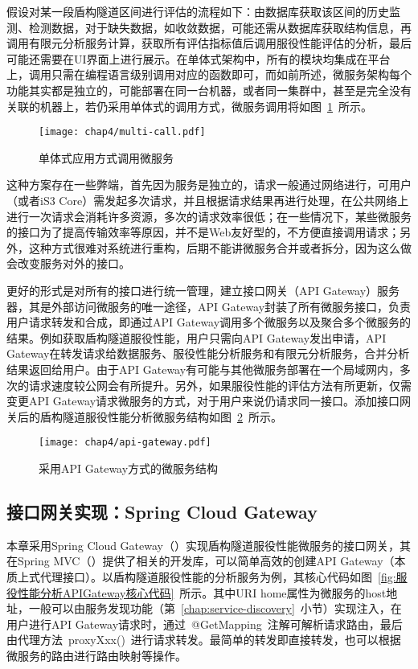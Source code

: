 假设对某一段盾构隧道区间进行评估的流程如下：由数据库获取该区间的历史监测、检测数据，对于缺失数据，如收敛数据，可能还需从数据库获取结构信息，再调用有限元分析服务计算，获取所有评估指标值后调用服役性能评估的分析，最后可能还需要在UI界面上进行展示。在单体式架构中，所有的模块均集成在平台上，调用只需在编程语言级别调用对应的函数即可，而如前所述，微服务架构每个功能其实都是独立的，可能部署在同一台机器，或者同一集群中，甚至是完全没有关联的机器上，若仍采用单体式的调用方式，微服务调用将如图~\ref{fig:单体架构方式调用微服务}~所示。

\begin{figure}[htb!]
    \centering
    \texttt{[image: chap4/multi-call.pdf]}
    \caption{单体式应用方式调用微服务}
    \label{fig:单体架构方式调用微服务}
\end{figure}

这种方案存在一些弊端，首先因为服务是独立的，请求一般通过网络进行，可用户（或者iS3 Core）需发起多次请求，并且根据请求结果再进行处理，在公共网络上进行一次请求会消耗许多资源，多次的请求效率很低；在一些情况下，某些微服务的接口为了提高传输效率等原因，并不是Web友好型的，不方便直接调用请求；另外，这种方式很难对系统进行重构，后期不能讲微服务合并或者拆分，因为这么做会改变服务对外的接口。

更好的形式是对所有的接口进行统一管理，建立接口网关（API Gateway）服务器，其是外部访问微服务的唯一途径，API Gateway封装了所有微服务接口，负责用户请求转发和合成，即通过API Gateway调用多个微服务以及聚合多个微服务的结果。例如获取盾构隧道服役性能，用户只需向API Gateway发出申请，API Gateway在转发请求给数据服务、服役性能分析服务和有限元分析服务，合并分析结果返回给用户。由于API Gateway有可能与其他微服务部署在一个局域网内，多次的请求速度较公网会有所提升。另外，如果服役性能的评估方法有所更新，仅需变更API Gateway请求微服务的方式，对于用户来说仍请求同一接口。添加接口网关后的盾构隧道服役性能分析微服务结构如图~\ref{fig:采用APIGateway方式的微服务结构}~所示。

\begin{figure}[htb!]
    \centering
    \texttt{[image: chap4/api-gateway.pdf]}
    \caption{采用API Gateway方式的微服务结构}
    \label{fig:采用APIGateway方式的微服务结构}
\end{figure}

\subsection{接口网关实现：Spring Cloud Gateway}

本章采用Spring Cloud Gateway（\citeyear{springcloudapigateway}）实现盾构隧道服役性能微服务的接口网关，其在Spring MVC（\citeyear{springmvc}）提供了相关的开发库，可以简单高效的创建API Gateway（本质上式代理接口）。以盾构隧道服役性能的分析服务为例，其核心代码如图~\ref{fig:服役性能分析APIGateway核心代码}~所示。其中URI home属性为微服务的host地址，一般可以由服务发现功能（第~\ref{chap:service-discovery}~小节）实现注入，在用户进行API Gateway请求时，通过~@GetMapping~注解可解析请求路由，最后由代理方法~proxyXxx()~进行请求转发。最简单的转发即直接转发，也可以根据微服务的路由进行路由映射等操作。

